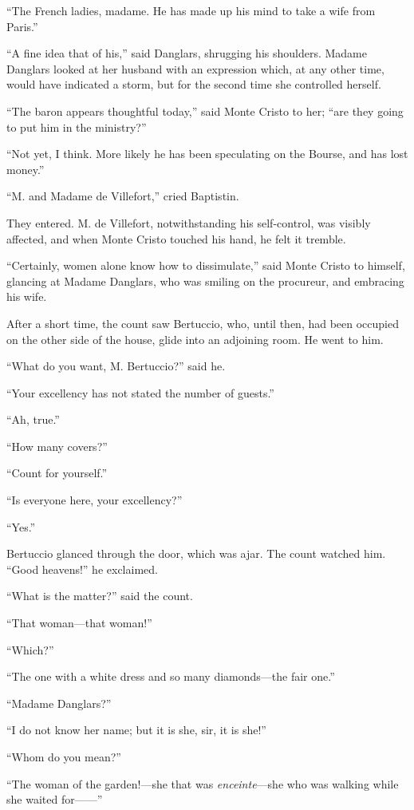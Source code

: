 “The French ladies, madame. He has made up his mind to take a wife from
Paris.”

“A fine idea that of his,” said Danglars, shrugging his shoulders.
Madame Danglars looked at her husband with an expression which, at any
other time, would have indicated a storm, but for the second time she
controlled herself.

“The baron appears thoughtful today,” said Monte Cristo to her; “are
they going to put him in the ministry?”

“Not yet, I think. More likely he has been speculating on the Bourse,
and has lost money.”

“M. and Madame de Villefort,” cried Baptistin.

They entered. M. de Villefort, notwithstanding his self-control, was
visibly affected, and when Monte Cristo touched his hand, he felt it
tremble.

“Certainly, women alone know how to dissimulate,” said Monte Cristo to
himself, glancing at Madame Danglars, who was smiling on the procureur,
and embracing his wife.

After a short time, the count saw Bertuccio, who, until then, had been
occupied on the other side of the house, glide into an adjoining room.
He went to him.

“What do you want, M. Bertuccio?” said he.

“Your excellency has not stated the number of guests.”

“Ah, true.”

“How many covers?”

“Count for yourself.”

“Is everyone here, your excellency?”

“Yes.”

Bertuccio glanced through the door, which was ajar. The count watched
him. “Good heavens!” he exclaimed.

“What is the matter?” said the count.

“That woman—that woman!”

“Which?”

“The one with a white dress and so many diamonds—the fair one.”

“Madame Danglars?”

“I do not know her name; but it is she, sir, it is she!”

“Whom do you mean?”

“The woman of the garden!—she that was \textit{enceinte}—she who was walking
while she waited for——”

